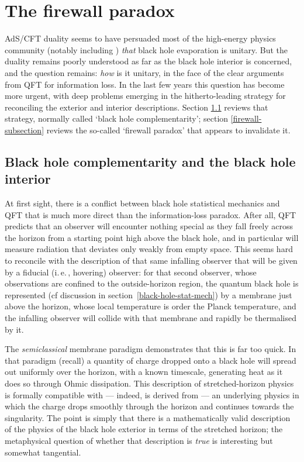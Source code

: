\documentclass{article}
\newcommand{\iec}{\mbox{i.\,e.\,}}
\begin{document}
\section{The firewall paradox}\label{firewall}

AdS/CFT duality seems to have persuaded most of the high-energy physics community (notably including ) \emph{that} black hole evaporation is unitary. But the duality remains poorly understood as far as the black hole interior is concerned, and the question remains: \emph{how} is it unitary, in the face of the clear arguments from QFT for information loss. In the last few years this question has become more urgent, with deep problems emerging in the hitherto-leading strategy for reconciling the exterior and interior descriptions. Section \ref{complementarity} reviews that strategy, normally called `black hole complementarity'; section \ref{firewall-subsection} reviews the so-called `firewall paradox' that appears to invalidate it.

\subsection{Black hole complementarity and the black hole interior}\label{complementarity}

At first sight, there is a conflict between black hole statistical mechanics and QFT that is much more direct than the information-loss paradox.  After all, QFT predicts that an observer will encounter nothing special as they fall freely across the horizon from a starting point high above the black hole, and in particular will measure radiation that deviates only weakly from empty space. This seems hard to reconcile with the description of that same infalling observer that will be given by a fiducial (\iec, hovering) observer: for that second observer, whose observations are confined to the outside-horizon region, the quantum black hole is represented (cf discussion in section~\ref{black-hole-stat-mech}) by a membrane just above the horizon, whose local temperature is order the Planck temperature, and the infalling observer will collide with that membrane and  rapidly be thermalised by it.

The \emph{semiclassical} membrane paradigm demonstrates that this is far too quick. In that paradigm (recall) a quantity of charge dropped onto a black hole will spread out uniformly over the horizon, with a known timescale, generating heat as it does so through Ohmic dissipation. This description of stretched-horizon physics is formally compatible with --- indeed, is derived from --- an underlying physics in which the charge drops smoothly through the horizon and continues towards the singularity. The point is simply that there is a mathematically valid description of the physics of the black hole exterior in terms of the stretched horizon; the metaphysical question of whether that description is \emph{true} is interesting but somewhat tangential.
\end{document}
